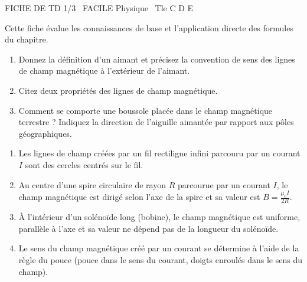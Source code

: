 \documentclass[11pt]{article}
\begin{document}
\begin{tcolorbox}[enhanced,colback=popink,colframe=popink,arc=10pt,boxrule=0pt,left=12pt,right=12pt,top=9pt,bottom=9pt]
{\color{white}\popxbold\small FICHE DE TD 1/3 \textbullet\ FACILE \hfill Physique \textbullet\ Tle C D E\par}
\end{tcolorbox}
\vspace{4pt}
Cette fiche évalue les connaissances de base et l'application directe des formules du chapitre.

\begin{exercice}
\begin{enumerate}
    \item Donnez la définition d'un aimant et précisez la convention de sens des lignes de champ magnétique à l'extérieur de l'aimant.
    \item Citez deux propriétés des lignes de champ magnétique.
    \item Comment se comporte une boussole placée dans le champ magnétique terrestre ? Indiquez la direction de l'aiguille aimantée par rapport aux pôles géographiques.
\end{enumerate}
\end{exercice}

\begin{exercice}
\begin{enumerate}
    \item Les lignes de champ créées par un fil rectiligne infini parcouru par un courant $I$ sont des cercles centrés sur le fil.
    \item Au centre d'une spire circulaire de rayon $R$ parcourue par un courant $I$, le champ magnétique est dirigé selon l'axe de la spire et sa valeur est $B = \frac{\mu_0 I}{2R}$.
    \item À l'intérieur d'un solénoïde long (bobine), le champ magnétique est uniforme, parallèle à l'axe et sa valeur ne dépend pas de la longueur du solénoïde.
    \item Le sens du champ magnétique créé par un courant se détermine à l'aide de la règle du pouce (pouce dans le sens du courant, doigts enroulés dans le sens du champ).
\end{enumerate}
\end{exercice}
\end{document}
